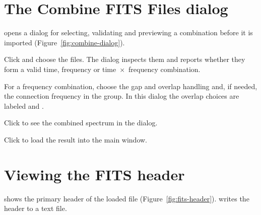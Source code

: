 \section{The Combine FITS Files dialog}
\label{sec:combine-dialog}

 opens a dialog for selecting, validating and previewing
a combination before it is imported (Figure~\ref{fig:combine-dialog}).

\begin{steps}
  \item Click  and choose the files. The dialog inspects them and
    reports whether they form a valid time, frequency or time~\(\times\)~frequency
    combination.
  \item For a frequency combination, choose the gap and overlap handling and, if needed,
    the connection frequency in the  group. In this dialog
    the overlap choices are labeled  and .
  \item Click  to see the combined spectrum in the dialog.
  \item Click  to load the result into the main window.
\end{steps}


\section{Viewing the FITS header}
\label{sec:fits-header}

 shows the primary header of the loaded file
(Figure~\ref{fig:fits-header}).  writes the header to a text file.

